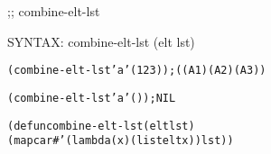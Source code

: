 \begin{aibox}{\function}
;; combine-elt-lst

SYNTAX: combine-elt-lst (elt lst)
\end{aibox}

\begin{aibox}{\examples}

\begin{alltt}
(combine-elt-lst 'a '(1 2 3)); ((A 1) (A 2) (A 3))

(combine-elt-lst 'a '()); NIL
\end{alltt}

\end{aibox}

\begin{aibox}{\comments}
\end{aibox}
\begin{aibox}{\answers}

\end{aibox}
\begin{aibox}{\othercomments}

\end{aibox}
\begin{aibox}{\pseudocode}

\end{aibox}
\begin{aibox}{\code}

\begin{alltt}

(defun combine-elt-lst (elt lst)
            (mapcar #'(lambda (x) (list elt x)) lst))

\end{alltt}
\end{aibox}
